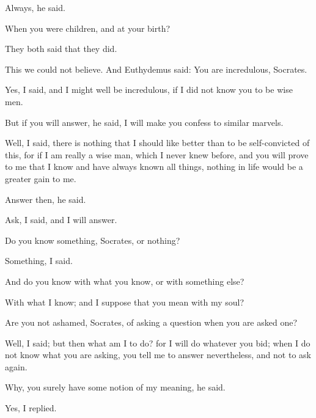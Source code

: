 \documentclass[11pt,letter]{article}
\begin{document}
\par  Always, he said.

\par  When you were children, and at your birth?

\par  They both said that they did.

\par  This we could not believe. And Euthydemus said: You are incredulous, Socrates.

\par  Yes, I said, and I might well be incredulous, if I did not know you to be wise men.

\par  But if you will answer, he said, I will make you confess to similar marvels.

\par  Well, I said, there is nothing that I should like better than to be self-convicted of this, for if I am really a wise man, which I never knew before, and you will prove to me that I know and have always known all things, nothing in life would be a greater gain to me.

\par  Answer then, he said.

\par  Ask, I said, and I will answer.

\par  Do you know something, Socrates, or nothing?

\par  Something, I said.

\par  And do you know with what you know, or with something else?

\par  With what I know; and I suppose that you mean with my soul?

\par  Are you not ashamed, Socrates, of asking a question when you are asked one?

\par  Well, I said; but then what am I to do? for I will do whatever you bid; when I do not know what you are asking, you tell me to answer nevertheless, and not to ask again.

\par  Why, you surely have some notion of my meaning, he said.

\par  Yes, I replied.
\end{document}
